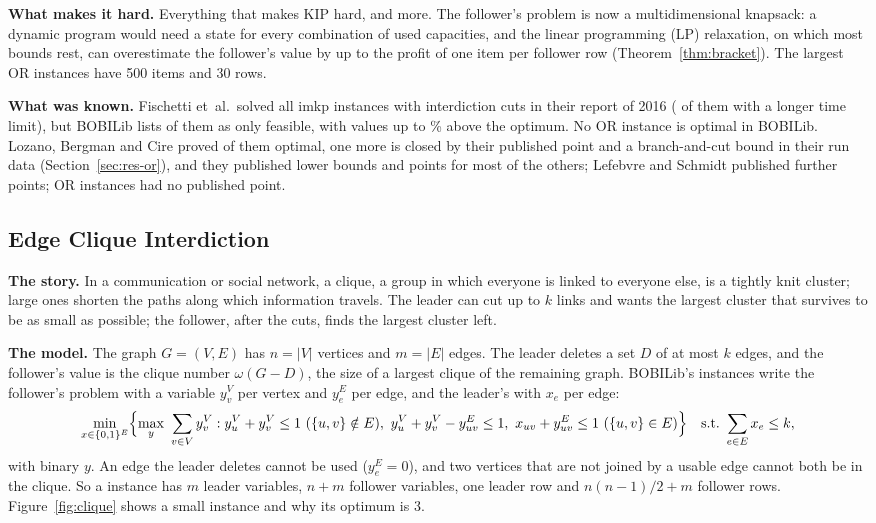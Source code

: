 \textbf{What makes it hard.} Everything that makes KIP hard, and more. The follower's problem is
now a multidimensional knapsack: a dynamic program would need a state for every combination of
used capacities, and the linear programming (LP) relaxation, on which most bounds rest, can
overestimate the follower's value by up to the profit of one item per follower row
(Theorem~\ref{thm:bracket}). The largest OR instances have 500 items and 30 rows.

\textbf{What was known.} Fischetti et~al.\ solved all \NumImkp{} imkp instances with
interdiction cuts in their report of 2016 (\NumLitImkpCaption{} of them with a longer time
limit),\cite{fischetti2016monotonicity} but BOBILib lists \NumLitImkp{} of them as only feasible,
with values up to \ImkpBobiExcessMax\% above the optimum. No OR instance is optimal in BOBILib. Lozano, Bergman and
Cire\cite{lozano2026network} proved \NumLitOrClaimed{} of them optimal, one more is closed by their
published point and a branch-and-cut bound in their run data (Section~\ref{sec:res-or}), and they
published lower bounds and points for most of the others;\cite{lozano_dbo_repo} Lefebvre and
Schmidt\cite{lefebvre2025dantzig} published further points; \NumOrNoPublished{} OR instances had
no published point.

\subsection{Edge Clique Interdiction}\label{sec:prob-clique}

\textbf{The story.} In a communication or social network, a clique, a group in which everyone is
linked to everyone else, is a tightly knit cluster; large ones shorten the paths along which
information travels.\cite{furini2021branch} The leader can cut up to $k$ links and wants the largest cluster
that survives to be as small as possible; the follower, after the cuts, finds the largest
cluster left.

\textbf{The model.} The graph $G=(V,E)$ has $n=|V|$ vertices and $m=|E|$ edges. The leader deletes
a set $D$ of at most $k$ edges, and the follower's value is the clique number $\omega(G-D)$, the
size of a largest clique of the remaining graph. BOBILib's  instances write the
follower's problem with a variable $y^V_v$ per vertex and $y^E_e$ per edge, and the leader's with
$x_e$ per edge:\cite{fischetti2018dynamic,tang2016class}
\[
\min_{x\in\{0,1\}^E}\Bigl\{\max_{y}\ \sum_{v\in V}y^V_v :
y^V_u+y^V_v\le 1\ (\{u,v\}\notin E),\
y^V_u+y^V_v-y^E_{uv}\le 1,\ x_{uv}+y^E_{uv}\le 1\ (\{u,v\}\in E)\Bigr\}
\quad\text{s.t.}\ \sum_{e\in E}x_e\le k,
\]
with binary $y$. An edge the leader deletes cannot be used ($y^E_e=0$), and two vertices that are
not joined by a usable edge cannot both be in the clique. So a \code{clique} instance has $m$
leader variables, $n+m$ follower variables, one leader row and $n(n-1)/2+m$ follower rows.
Figure~\ref{fig:clique} shows a small instance and why its optimum is 3.

